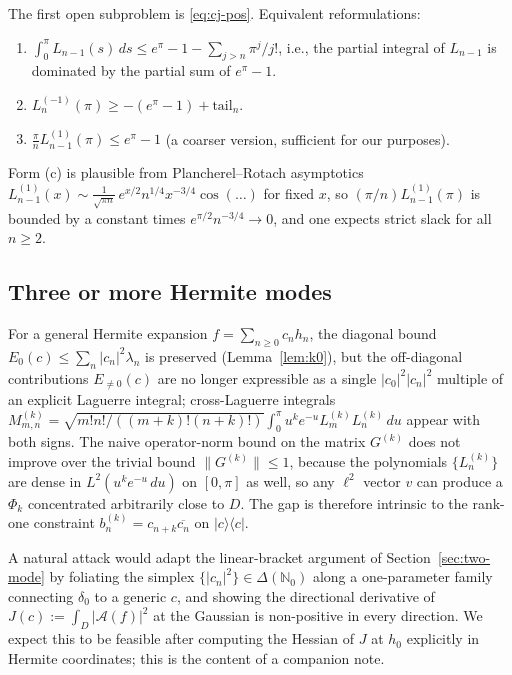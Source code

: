 \documentclass[11pt]{article}
\theoremstyle{definition}
\newcommand{\N}{\mathbb{N}}
\newcommand{\Amb}{\mathcal{A}}
\newcommand{\norm}[1]{\lVert#1\rVert}
\begin{document}
The first open subproblem is \eqref{eq:cj-pos}.  Equivalent reformulations:
\begin{enumerate}[label=(\alph*)]
  \item $\int_{0}^{\pi}L_{n-1}(s)\,ds \le e^{\pi}-1-\sum_{j>n}\pi^{j}/j!$,
        i.e., the partial integral of $L_{n-1}$ is dominated by the partial
        sum of $e^{\pi}-1$.
  \item $L_{n}^{(-1)}(\pi)\ge -(e^{\pi}-1)+\text{tail}_{n}$.
  \item $\frac{\pi}{n}L_{n-1}^{(1)}(\pi)\le e^{\pi}-1$ (a coarser version,
        sufficient for our purposes).
\end{enumerate}
Form (c) is plausible from Plancherel--Rotach asymptotics
$L_{n-1}^{(1)}(x)\sim \frac{1}{\sqrt{\pi n}}\,e^{x/2}n^{1/4}x^{-3/4}\cos(\dots)$
for fixed $x$, so $(\pi/n)L_{n-1}^{(1)}(\pi)$ is bounded by a constant times
$e^{\pi/2}n^{-3/4}\to 0$, and one expects strict slack for all $n\ge 2$.

\subsection{Three or more Hermite modes}

For a general Hermite expansion $f=\sum_{n\ge 0}c_{n}h_{n}$, the diagonal
bound $E_{0}(c)\le\sum_{n}|c_{n}|^{2}\lambda_{n}$ is preserved
(Lemma~\ref{lem:k0}), but the off-diagonal contributions $E_{\ne 0}(c)$ are
no longer expressible as a single $|c_{0}|^{2}|c_{n}|^{2}$ multiple of an
explicit Laguerre integral; cross-Laguerre integrals
$M^{(k)}_{m,n}=\sqrt{m!n!/((m+k)!(n+k)!)}\int_{0}^{\pi}u^{k}e^{-u}L_{m}^{(k)}L_{n}^{(k)}\,du$
appear with both signs.  The naive operator-norm bound on the matrix
$G^{(k)}$ does not improve over the trivial bound $\norm{G^{(k)}}\le 1$,
because the polynomials $\{L_{n}^{(k)}\}$ are dense in $L^{2}(u^{k}e^{-u}\,du)$
on $[0,\pi]$ as well, so any $\ell^{2}$ vector $v$ can produce a $\Phi_{k}$
concentrated arbitrarily close to $D$.  The gap is therefore intrinsic to
the rank-one constraint $b^{(k)}_{n}=c_{n+k}\overline{c_{n}}$ on
$|c\rangle\langle c|$.

A natural attack would adapt the linear-bracket argument of
Section~\ref{sec:two-mode} by foliating the simplex
$\{|c_{n}|^{2}\}\in\Delta(\N_{0})$ along a one-parameter family connecting
$\delta_{0}$ to a generic $c$, and showing the directional derivative of
$J(c):=\int_{D}|\Amb(f)|^{2}$ at the Gaussian is non-positive in every
direction.  We expect this to be feasible after computing the Hessian of $J$
at $h_{0}$ explicitly in Hermite coordinates; this is the content of a
companion note.
\end{document}
